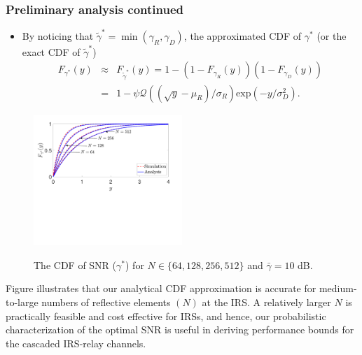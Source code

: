 \documentclass[article,mathserif,10pt,envcountsect]{beamer}
\newcommand{\Exp}[1]{\mathrm{exp}\left(#1\right)}
\begin{document}
\begin{frame}
	\frametitle{Preliminary analysis continued}
	\begin{itemize}
		\item By noticing that $\tilde{\gamma}^* =  \min{\left(\gamma_R,\gamma_D\right)}$, the approximated CDF of $\gamma^*$ (or the exact CDF of $\tilde{\gamma}^*$) 
		\begin{eqnarray}\label{eqn:cdf_gamma_upper}
		\!\!\!\!\!\! F_{\gamma^*}(y) &\approx& F_{\tilde{\gamma}^*}(y) = 1-\left(1- F_{\gamma_R}(y)\right)\left(1- F_{\gamma_D}(y)\right) \nonumber \\
		&=& 1 - \psi \mathcal{Q}\left((\sqrt{y}-\mu_R)/\sigma_{R}\right) \Exp{-y/\sigma_D^2}. \nonumber
		\end{eqnarray}


	
	\end{itemize}
\vspace{-5mm}	

	\hspace{-0.3cm}
	\begin{minipage}[t]{0.5\linewidth}	
		\begin{figure}
			\vspace{-0mm}
			\centering
			\includegraphics[width=5.6cm]{CDF_L_64_128_256_512_half.pdf}\label{fig:PDF_CDF_M_N}\vspace{-20mm}
			\caption{The CDF of  SNR ($\gamma^*$) for $N \in \{64, 128, 256, 512\}$ and $\bar{\gamma}= 10$ dB.}
		\end{figure}
		
	\end{minipage}\hspace{0.0cm}
	\begin{minipage}[t]{0.5\linewidth}	
		\begin{block}{}
			 Figure  illustrates that our analytical CDF approximation is accurate   for medium-to-large  numbers of reflective elements $(N)$ at the IRS.  A relatively larger $N$ is practically feasible and cost effective for IRSs, and hence, our probabilistic characterization of the optimal SNR  is useful in deriving performance bounds for the cascaded IRS-relay channels.  
		\end{block}
		
		 
		
	\end{minipage}
	
\end{frame}
\end{document}
